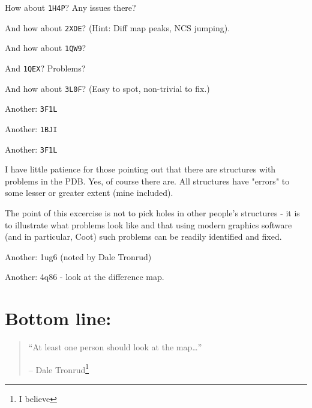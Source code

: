 \documentclass{article}
\begin{document}
How about \texttt{1H4P}?  Any issues there?

And how about \texttt{2XDE}? %
(Hint: Diff map peaks, NCS jumping).

And how about \texttt{1QW9}?

And \texttt{1QEX}?  Problems?

And how about \texttt{3L0F}? (Easy to spot, non-trivial to
fix.) %

Another: \texttt{3F1L}


Another: \texttt{1BJI}



Another: \texttt{3F1L}

I have little patience for those pointing out that there are
structures with problems in the PDB. Yes, of course there are. All
structures have "errors" to some lesser or greater extent (mine
included).

The point of this excercise is not to pick holes in other people's
structures - it is to illustrate what problems look like and that
using modern graphics software (and in particular, Coot) such problems
can be readily identified and fixed.


Another: 1ug6 (noted by Dale Tronrud)

Another: 4q86 - look at the difference map.  

%   


\section*{Bottom line:}

\begin{quotation}
  ``At least one person should look at the map\ldots'' 

  -- Dale Tronrud\footnote{I believe}
\end{quotation}
\end{document}
